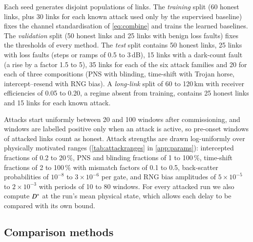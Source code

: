 Each seed generates disjoint populations of links. The \emph{training} split (60 honest links, plus 30 links for each known attack used only by the supervised baseline) fixes the channel standardisation of \cref{eq:combine} and trains the learned baselines. The \emph{validation} split (50 honest links and 25 links with benign loss faults) fixes the thresholds of every method. The \emph{test} split contains 50 honest links, 25 links with loss faults (steps or ramps of 0.5 to 3\,dB), 15 links with a dark-count fault (a rise by a factor 1.5 to 5), 35 links for each of the six attack families and 20 for each of three compositions (PNS with blinding, time-shift with Trojan horse, intercept--resend with RNG bias). A \emph{long-link} split of 60 to 120\,km with receiver efficiencies of 0.05 to 0.20, a regime absent from training, contains 25 honest links and 15 links for each known attack.

Attacks start uniformly between 20 and 100 windows after commissioning, and windows are labelled positive only when an attack is active, so pre-onset windows of attacked links count as honest. Attack strengths are drawn log-uniformly over physically motivated ranges (\cref{tab:attackranges} in \cref{app:params}): intercepted fractions of 0.2 to 20\,\%, PNS and blinding fractions of 1 to 100\,\%, time-shift fractions of 2 to 100\,\% with mismatch factors of 0.1 to 0.5, back-scatter probabilities of $10^{-8}$ to $3\times10^{-6}$ per gate, and RNG bias amplitudes of $5\times10^{-5}$ to $2\times10^{-3}$ with periods of 10 to 80 windows. For every attacked run we also compute $D^{\ast}$ at the run's mean physical state, which allows each delay to be compared with its own bound.

\subsection{Comparison methods}\label{sec:baselines}

